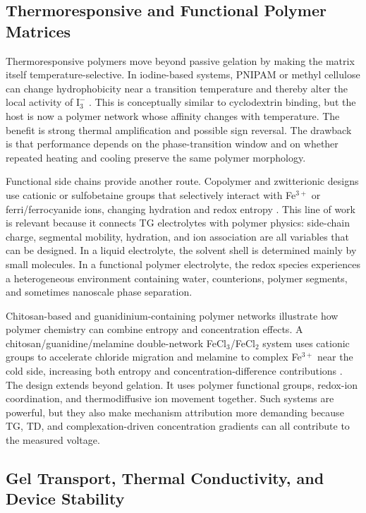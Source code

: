 \documentclass[a4paper,12pt]{report}
\begin{document}
\subsection{Thermoresponsive and Functional Polymer Matrices}

Thermoresponsive polymers move beyond passive gelation by making the matrix
itself temperature-selective. In iodine-based systems, PNIPAM or methyl
cellulose can change hydrophobicity near a transition temperature and thereby
alter the local activity of $\mathrm{I}_3^-$ \citep{duan2019pn}. This is
conceptually similar to cyclodextrin binding, but the host is now a polymer
network whose affinity changes with temperature. The benefit is strong thermal
amplification and possible sign reversal. The drawback is that performance
depends on the phase-transition window and on whether repeated heating and
cooling preserve the same polymer morphology.

Functional side chains provide another route. Copolymer and zwitterionic
designs use cationic or sulfobetaine groups that
selectively interact with Fe$^{3+}$ or ferri/ferrocyanide ions, changing
hydration and redox entropy \citep{lu2024zwitterion}. This line of work is
relevant because it connects TG electrolytes with polymer physics: side-chain
charge, segmental mobility, hydration, and ion association are all variables
that can be designed. In a liquid electrolyte, the solvent shell is determined
mainly by small molecules. In a functional polymer electrolyte, the redox
species experiences a heterogeneous environment containing water, counterions,
polymer segments, and sometimes nanoscale phase separation.

Chitosan-based and guanidinium-containing polymer networks illustrate how
polymer chemistry can combine entropy and concentration effects. A
chitosan/guanidine/melamine double-network FeCl$_3$/FeCl$_2$ system uses
cationic groups to accelerate chloride migration and melamine to complex
Fe$^{3+}$ near the cold side, increasing both entropy and
concentration-difference contributions \citep{hu2024doubleselective}. The design
extends beyond gelation. It uses polymer functional groups,
redox-ion coordination, and thermodiffusive ion movement together. Such systems
are powerful, but they also make mechanism attribution more demanding because
TG, TD, and complexation-driven concentration gradients can all contribute to
the measured voltage.

\subsection{Gel Transport, Thermal Conductivity, and Device Stability}
\end{document}
